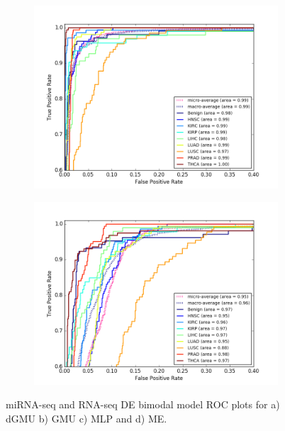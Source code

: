 \begin{figure}[H]
\begin{subfigure}[b]{0.49\textwidth}
         \caption{}
     \end{subfigure}
     \hfill
     \begin{subfigure}[b]{0.49\textwidth}
         \centering
         \includegraphics[width=\textwidth]{img/m_r/de_r_m_mlp_roc.png}
         \caption{}
     \end{subfigure}
     \begin{subfigure}[b]{0.49\textwidth}
         \centering
         \includegraphics[width=\textwidth]{img/m_r/de_r_m_moe_roc.png}
         \caption{}
     \end{subfigure}
        \caption{miRNA-seq and RNA-seq DE bimodal model ROC plots for a) dGMU b) GMU c) MLP and d) ME.}
        \label{fig:m_r_de_roc}
\end{figure}

